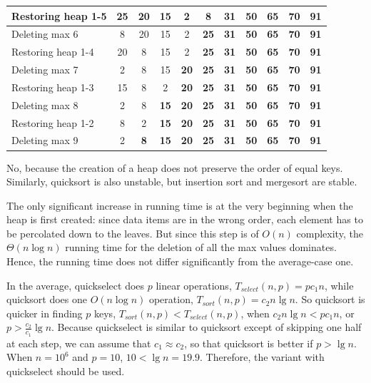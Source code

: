 \begin{center}
{\begin{tabular}{|l|c|c|c|c|c|c|c|c|c|c|}
Restoring heap 1-5& 25& 20& 15& 2& 8& \textbf{31}& \textbf{50}& \textbf{65}& \textbf{70}& \textbf{91} \\
\hline
Deleting max 6& 8& 20& 15& 2& \textbf{25}& \textbf{31}& \textbf{50}& \textbf{65}& \textbf{70}& \textbf{91} \\
Restoring heap 1-4& 20& 8& 15& 2& \textbf{25}& \textbf{31}& \textbf{50}& \textbf{65}& \textbf{70}& \textbf{91} \\
\hline
Deleting max 7& 2& 8& 15& \textbf{20}& \textbf{25}& \textbf{31}& \textbf{50}& \textbf{65}& \textbf{70}& \textbf{91} \\
Restoring heap 1-3& 15& 8& 2& \textbf{20}& \textbf{25}& \textbf{31}& \textbf{50}& \textbf{65}& \textbf{70}& \textbf{91} \\
\hline
Deleting max 8& 2& 8& \textbf{15}& \textbf{20}& \textbf{25}& \textbf{31}& \textbf{50}& \textbf{65}& \textbf{70}& \textbf{91} \\
Restoring heap 1-2& 8& 2& \textbf{15}& \textbf{20}& \textbf{25}& \textbf{31}& \textbf{50}& \textbf{65}& \textbf{70}& \textbf{91} \\
\hline
Deleting max 9& 2& \textbf{8}& \textbf{15}& \textbf{20}& \textbf{25}& \textbf{31}& \textbf{50}& \textbf{65}& \textbf{70}& \textbf{91} \\
\hline
\end{tabular}
}
\end{center}

{}%
No, because the creation of a heap does not preserve the order of equal keys.
Similarly, quicksort is also unstable, but insertion sort and mergesort are stable.

The only significant increase in running time is at the very beginning 
when the heap is first created: since data items are in the wrong order, 
each element has to be percolated down to the leaves. But since this step 
is of \(O(n)\) complexity, the \(\Theta(n\log{n})\) running time for the 
deletion of all the max values dominates. Hence, the 
running time does not differ significantly from 
the average-case one.

In the average, quickselect does \(p\) linear operations, $T_{select}(n,p) = pc_1n$,
while quicksort does one \(O(n\log{n})\) operation, $T_{sort}(n,p) = c_2n \lg{n}$.
So quicksort is quicker in finding \(p\) keys, 
\(T_{sort}(n,p) < T_{select}(n,p)\), when \(c_2n \lg{n} < pc_1n\),
or \(p > \frac{c_2}{c_1} \lg{n} \). 
Because quickselect is similar to quicksort except of skipping one half at each step, 
we can assume that \(c_1 \approx c_2 \), so that
quicksort is better if \(p > \lg{n}\).
When \(n=10^6\) and \(p=10\), \(10 < \lg{n}= 19.9\). Therefore, 
the variant with quickselect should
be used.


